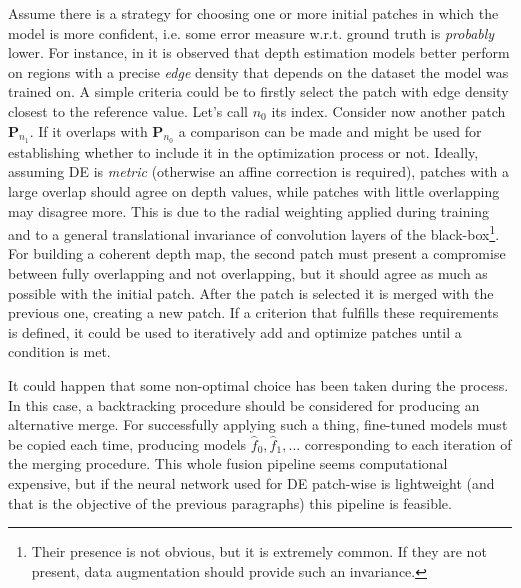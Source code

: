 Assume there is a strategy for choosing one or more initial patches in which the model is more confident, i.e. some error measure w.r.t. ground truth is \textit{probably} lower.
For instance, in \cite{BoostingDepth} it is observed that depth estimation models better perform on regions with a precise \textit{edge} density that depends on the dataset the model was trained on.
A simple criteria could be to firstly select the patch with edge density closest to the reference value.
Let's call $n_{0}$ its index.
Consider now another patch $\mathbf{P}_{n_{1}}$.
If it overlaps with $\mathbf{P}_{n_{0}}$ a comparison can be made and might be used for establishing whether to include it in the optimization process or not.
Ideally, assuming DE is \textit{metric} (otherwise an affine correction is required), patches with a large overlap should agree on depth values, while patches with little overlapping may disagree more.
This is due to the radial weighting applied during training and to a general translational invariance of convolution layers of the black-box\footnote{Their presence is not obvious, but it is extremely common. If they are not present, data augmentation should provide such an invariance.}.
For building a coherent depth map, the second patch must present a compromise between fully overlapping and not overlapping, but it should agree as much as possible with the initial patch.
After the patch is selected it is merged with the previous one, creating a new patch.
If a criterion that fulfills these requirements is defined, it could be used to iteratively add and optimize patches until a condition is met.

It could happen that some non-optimal choice has been taken during the process.
In this case, a backtracking procedure should be considered for producing an alternative merge.
For successfully applying such a thing, fine-tuned models must be copied each time, producing models $\hat{f}_{0}, \hat{f}_{1}, \dotsc$ corresponding to each iteration of the merging procedure.
This whole fusion pipeline seems computational expensive, but if the neural network used for DE patch-wise is lightweight (and that is the objective of the previous paragraphs) this pipeline is feasible.

